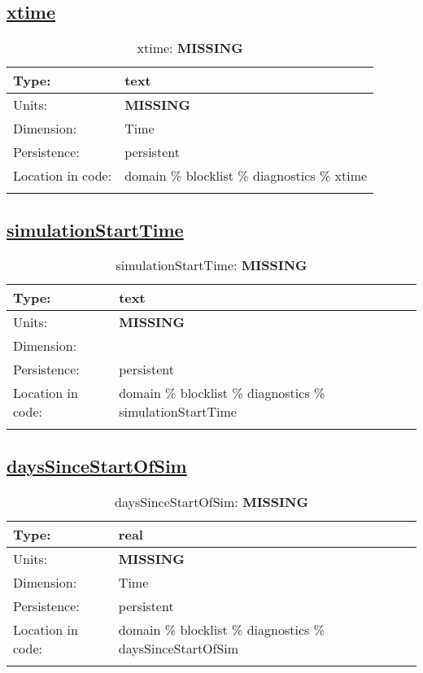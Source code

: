 \subsection[xtime]{\hyperref[sec:var_tab_diagnostics]{xtime}}
\label{subsec:var_sec_diagnostics_xtime}
\begin{center}
\begin{longtable}{| p{2.0in} | p{4.0in} |}
        \hline 
        Type: & text \\
        \hline 
        Units: & {\bf \color{red} MISSING} \\
        \hline 
        Dimension: & Time \\
        \hline 
        Persistence: & persistent \\
        \hline 
         Location in code: & domain \% blocklist \% diagnostics \% xtime \\
         \hline 
    \caption{xtime: {\bf \color{red} MISSING}}
\end{longtable}
\end{center}
\subsection[simulationStartTime]{\hyperref[sec:var_tab_diagnostics]{simulationStartTime}}
\label{subsec:var_sec_diagnostics_simulationStartTime}
\begin{center}
\begin{longtable}{| p{2.0in} | p{4.0in} |}
        \hline 
        Type: & text \\
        \hline 
        Units: & {\bf \color{red} MISSING} \\
        \hline 
        Dimension: &  \\
        \hline 
        Persistence: & persistent \\
        \hline 
         Location in code: & domain \% blocklist \% diagnostics \% simulationStartTime \\
         \hline 
    \caption{simulationStartTime: {\bf \color{red} MISSING}}
\end{longtable}
\end{center}
\subsection[daysSinceStartOfSim]{\hyperref[sec:var_tab_diagnostics]{daysSinceStartOfSim}}
\label{subsec:var_sec_diagnostics_daysSinceStartOfSim}
\begin{center}
\begin{longtable}{| p{2.0in} | p{4.0in} |}
        \hline 
        Type: & real \\
        \hline 
        Units: & {\bf \color{red} MISSING} \\
        \hline 
        Dimension: & Time \\
        \hline 
        Persistence: & persistent \\
        \hline 
         Location in code: & domain \% blocklist \% diagnostics \% daysSinceStartOfSim \\
         \hline 
    \caption{daysSinceStartOfSim: {\bf \color{red} MISSING}}
\end{longtable}
\end{center}
